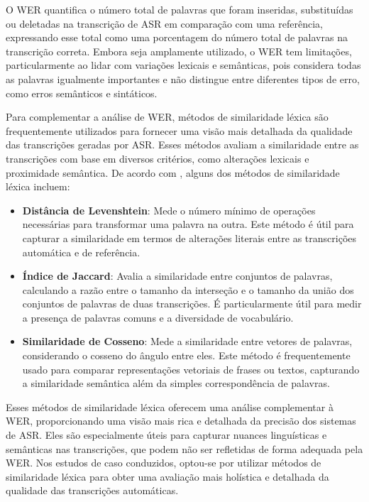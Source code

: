 O WER quantifica o número total de palavras que foram inseridas, substituídas ou deletadas na transcrição de ASR em comparação com uma referência, expressando esse total como uma porcentagem do número total de palavras na transcrição correta. Embora seja amplamente utilizado, o WER tem limitações, particularmente ao lidar com variações lexicais e semânticas, pois considera todas as palavras igualmente importantes e não distingue entre diferentes tipos de erro, como erros semânticos e sintáticos.

Para complementar a análise de WER, métodos de similaridade léxica são frequentemente utilizados para fornecer uma visão mais detalhada da qualidade das transcrições geradas por ASR. Esses métodos avaliam a similaridade entre as transcrições com base em diversos critérios, como alterações lexicais e proximidade semântica. De acordo com \cite{Majumdar2022}, alguns dos métodos de similaridade léxica incluem:

\begin{itemize}
\item \textbf{Distância de Levenshtein}: Mede o número mínimo de operações necessárias para transformar uma palavra na outra. Este método é útil para capturar a similaridade em termos de alterações literais entre as transcrições automática e de referência.
\item \textbf{Índice de Jaccard}: Avalia a similaridade entre conjuntos de palavras, calculando a razão entre o tamanho da interseção e o tamanho da união dos conjuntos de palavras de duas transcrições. É particularmente útil para medir a presença de palavras comuns e a diversidade de vocabulário.
\item \textbf{Similaridade de Cosseno}: Mede a similaridade entre vetores de palavras, considerando o cosseno do ângulo entre eles. Este método é frequentemente usado para comparar representações vetoriais de frases ou textos, capturando a similaridade semântica além da simples correspondência de palavras.
\end{itemize}

Esses métodos de similaridade léxica oferecem uma análise complementar à WER, proporcionando uma visão mais rica e detalhada da precisão dos sistemas de ASR. Eles são especialmente úteis para capturar nuances linguísticas e semânticas nas transcrições, que podem não ser refletidas de forma adequada pela WER. Nos estudos de caso conduzidos, optou-se por utilizar métodos de similaridade léxica para obter uma avaliação mais holística e detalhada da qualidade das transcrições automáticas.

